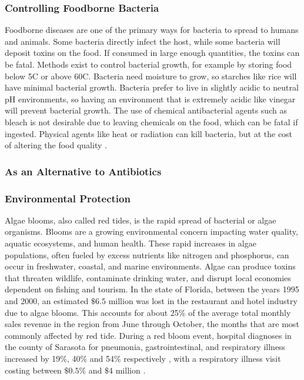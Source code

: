 \subsubsection{Controlling Foodborne Bacteria}
Foodborne diseases are one of the primary ways for bacteria to spread to humans and animals. Some bacteria directly infect the host, while some bacteria will deposit toxins on the food. If consumed in large enough quantities, the toxins can be fatal. Methods exist to control bacterial growth, for example by storing food below 5C or above 60C. Bacteria need moisture to grow, so starches like rice will have minimal bacterial growth. Bacteria prefer to live in slightly acidic to neutral pH environments, so having an environment that is extremely acidic like vinegar will prevent bacterial growth. The use of chemical antibacterial agents such as bleach is not desirable due to leaving chemicals on the food, which can be fatal if ingested. Physical agents like heat or radiation can kill bacteria, but at the cost of altering the food quality \cite{fieseler_food_2021}. 

\subsubsection{As an Alternative to Antibiotics}


\subsubsection{Environmental Protection}
Algae blooms, also called red tides, is the rapid spread of bacterial or algae organisms. Blooms are a growing environmental concern impacting water quality, aquatic ecosystems, and human health. These rapid increases in algae populations, often fueled by excess nutrients like nitrogen and phosphorus, can occur in freshwater, coastal, and marine environments. Algae can produce toxins that threaten wildlife, contaminate drinking water, and disrupt local economies dependent on fishing and tourism. In the state of Florida, between the years 1995 and 2000, an estimated $\$6.5$ million was lost in the restaurant and hotel industry due to algae blooms. This accounts for about 25\% of the average total monthly sales revenue in the region from June through October, the months that are most commonly affected by red tide\cite{PDFEconomicImpacts}. During a red bloom event, hospital diagnoses in the county of Sarasota for pneumonia, gastrointestinal, and respiratory illness increased by 19\%, 40\% and 54\% respectively \cite{chengCharacterizationMarineAerosol2005, kirkpatrickGastrointestinalEmergencyRoom2010}, with a respiratory illness visit costing between $\$0.5\%$ and $\$4$ million \cite{hoaglandCostsRespiratoryIllnesses2009}. 

